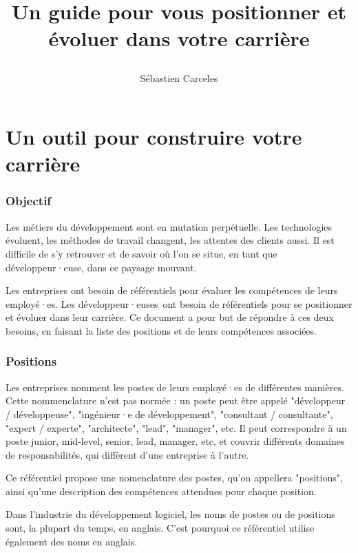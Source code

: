 \documentclass[a4paper, french, openany, 12pt]{book}
\title{
  \vspace*{-8cm}

  \fullwidthimage{images/cover.jpg}

  \vspace*{5cm}

  \bsc{Référenciel de compétences pour développeurs et développeuses}

  Un guide pour vous positionner et évoluer dans votre carrière
}
\author{Sébastien Carceles}
\date{}
\newcommand\dev{développeur·euse}
\newcommand\devs{développeur·euses}
\begin{document}
\begin{titlepage}
  \maketitle
\end{titlepage}

\mainmatter

\part{Un outil pour construire  votre carrière}

\begin{multicols}{2}

  \section*{Objectif}

  Les métiers du développement sont en mutation perpétuelle.
  Les technologies évoluent, les méthodes de travail changent, les attentes des clients aussi.
  Il est difficile de s'y retrouver et de savoir où l'on se situe, en tant que \dev, dans ce paysage mouvant.

  Les entreprises ont besoin de référentiels pour évaluer les compétences de leurs employé·es.
  Les \devs\ ont besoin de référentiels pour se positionner et évoluer dans leur carrière.
  Ce document a pour but de répondre à ces deux besoins, en faisant la liste des positions et de leurs compétences
  associées.

  \section*{Positions}

  Les entreprises nomment les postes de leurs employé·es de différentes manières.
  Cette nommenclature n'est pas normée : un poste peut être appelé "développeur / développeuse", "ingénieur·e de
  développement", "consultant / consultante", "expert / experte", "architecte", "lead", "manager", etc.
  Il peut correspondre à un poste junior, mid-level, senior, lead, manager, etc, et couvrir différents domaines de
  responsabilités, qui diffèrent d'une entreprise à l'autre.

  Ce référentiel propose une nomenclature des postes, qu'on appellera "positions",
  ainsi qu'une description des compétences attendues pour chaque position.

  Dans l'industrie du développement logiciel, les noms de postes ou de positions sont, la plupart du temps, en anglais.
  C'est pourquoi ce référentiel utilise également des noms en anglais.


\end{multicols}
\end{document}
